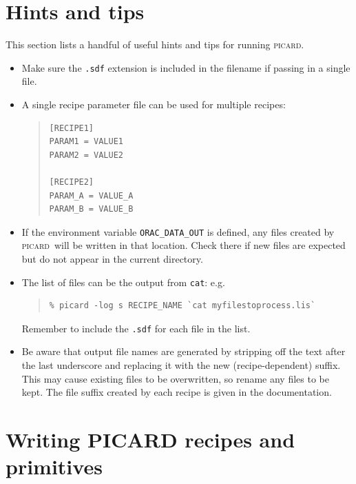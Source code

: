 \documentclass[twoside,11pt]{article}
\renewcommand{\_}{\texttt{\symbol{95}}}
\newenvironment{myquote}{\begin{quote}\begin{small}}{\end{small}\end{quote}}
\newcommand{\picard}{\textsc{picard}}
\begin{document}
\section{Hints and tips\label{se:hints}}

This section lists a handful of useful hints and tips for running
\picard.

\begin{itemize}

\item
Make sure the \verb+.sdf+ extension is included in the filename if
passing in a single file.

\item A single recipe parameter file can be used for multiple recipes:
\begin{myquote}
\begin{verbatim}
[RECIPE1]
PARAM1 = VALUE1
PARAM2 = VALUE2

[RECIPE2]
PARAM_A = VALUE_A
PARAM_B = VALUE_B
\end{verbatim}
\end{myquote}

\item

If the environment variable \verb+ORAC_DATA_OUT+ is defined, any files
created by \picard\ will be written in that location. Check there if new
files are expected but do not appear in the current directory.

\item

The list of files can be the output from \texttt{cat}: e.g.\
\begin{myquote}
\begin{verbatim}
% picard -log s RECIPE_NAME `cat myfilestoprocess.lis`
\end{verbatim}
\end{myquote}
Remember to include the \verb+.sdf+ for each file in the list.

\item

Be aware that output file names are generated by stripping off the
text after the last underscore and replacing it with the new
(recipe-dependent) suffix. This may cause existing files to be
overwritten, so rename any files to be kept. The file suffix created
by each recipe is given in the documentation.

\end{itemize}

\section{Writing PICARD recipes and primitives\label{se:write}}
\end{document}
